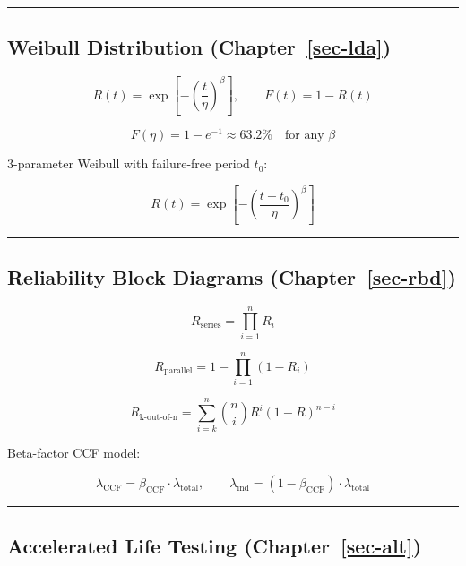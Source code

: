 \documentclass[
  letterpaper,
  DIV=11,
  numbers=noendperiod]{scrreprt}
\begin{document}
\begin{center}\rule{0.5\linewidth}{0.5pt}\end{center}

\subsection*{\texorpdfstring{Weibull Distribution
(Chapter~\ref{sec-lda})}{Weibull Distribution (Chapter~)}}\label{weibull-distribution-sec-lda}

\[R(t) = \exp\!\left[-\left(\frac{t}{\eta}\right)^{\!\beta}\right], \qquad F(t) = 1 - R(t)\]

\[F(\eta) = 1 - e^{-1} \approx 63.2\% \quad \text{for any } \beta\]

3-parameter Weibull with failure-free period \(t_0\):

\[R(t) = \exp\!\left[-\left(\frac{t - t_0}{\eta}\right)^{\!\beta}\right]\]

\begin{center}\rule{0.5\linewidth}{0.5pt}\end{center}

\subsection*{\texorpdfstring{Reliability Block Diagrams
(Chapter~\ref{sec-rbd})}{Reliability Block Diagrams (Chapter~)}}\label{reliability-block-diagrams-sec-rbd}

\[R_{\text{series}} = \prod_{i=1}^{n} R_i\]

\[R_{\text{parallel}} = 1 - \prod_{i=1}^{n}(1 - R_i)\]

\[R_{\text{k-out-of-n}} = \sum_{i=k}^{n} \binom{n}{i} R^i (1-R)^{n-i}\]

Beta-factor CCF model:

\[\lambda_{\text{CCF}} = \beta_{\text{CCF}} \cdot \lambda_{\text{total}}, \qquad \lambda_{\text{ind}} = (1 - \beta_{\text{CCF}}) \cdot \lambda_{\text{total}}\]

\begin{center}\rule{0.5\linewidth}{0.5pt}\end{center}

\subsection*{\texorpdfstring{Accelerated Life Testing
(Chapter~\ref{sec-alt})}{Accelerated Life Testing (Chapter~)}}\label{accelerated-life-testing-sec-alt}
\end{document}
